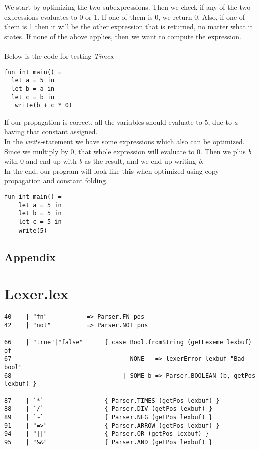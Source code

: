 \documentclass[paper=a4, fontsize=11pt]{scrartcl} %
\numberwithin{equation}{section} %
\numberwithin{figure}{section} %
\numberwithin{table}{section} %
\begin{document}
We start by optimizing the two subexpressions. Then we check if any of the two expressions evaluates to 0 or 1. If one of them is 0, we return 0. Also, if one of them is 1 then it will be the other expression that is returned, no matter what it states. If none of the above applies, then we want to compute the expression.\\\\
Below is the code for testing \textit{Times}. 
\begin{lstlisting}
fun int main() = 
  let a = 5 in
  let b = a in
  let c = b in
   write(b + c * 0)
\end{lstlisting}
If our propagation is correct, all the variables should evaluate to 5, due to \textit{a} having that constant assigned.\\
In the \textit{write-}statement we have some expressions which also can be optimized. Since we multiply by 0, that whole expression will evaluate to 0. Then we plus \textit{b} with 0 and end up with \textit{b} as the result, and we end up writing \textit{b}.\\
In the end, our program will look like this when optimized using copy propagation and constant folding.
\begin{lstlisting}
fun int main() =  
    let a = 5 in    
    let b = 5 in    
    let c = 5 in
    write(5)
\end{lstlisting}

\pagebreak

\section*{Appendix}

\appendix

\chapter{Lexer.lex}

\begin{lstlisting}
40	  | "fn"           => Parser.FN pos 
42	  | "not"          => Parser.NOT pos

66	  | "true"|"false"      { case Bool.fromString (getLexeme lexbuf) of 
67	                               NONE   => lexerError lexbuf "Bad bool" 
68	                             | SOME b => Parser.BOOLEAN (b, getPos lexbuf) }

87	  | `*`                 { Parser.TIMES (getPos lexbuf) } 
88	  | `/`                 { Parser.DIV (getPos lexbuf) } 
89	  | `~`                 { Parser.NEG (getPos lexbuf) }
91	  | "=>"                { Parser.ARROW (getPos lexbuf) } 
94	  | "||"                { Parser.OR (getPos lexbuf) } 
95	  | "&&"                { Parser.AND (getPos lexbuf) } 
\end{lstlisting}
\end{document}
